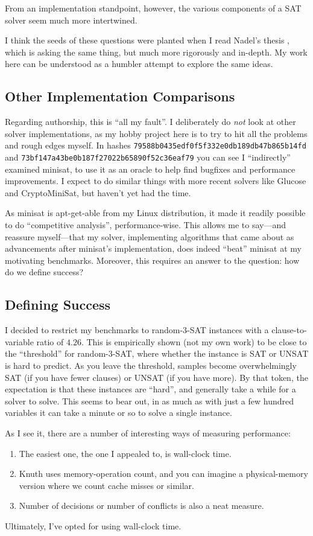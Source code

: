\documentclass{article}
\begin{document}
From an implementation standpoint, however, the various components of a SAT solver seem much more intertwined.

I think the seeds of these questions were planted when I read Nadel's thesis \cite{nadel2008}, which is asking the same thing, but much more rigorously and in-depth.
My work here can be understood as a humbler attempt to explore the same ideas.
\subsection{Other Implementation Comparisons}
Regarding authorship, this is ``all my fault''.
I deliberately do \emph{not} look at other solver implementations, as my hobby project here is to try to hit all the problems and rough edges myself.
In hashes {\tt 79588b0435edf0f5f332e0db189db47b865b14fd} and {\tt 73bf147a43be0b187f27022b65890f52c36eaf79} you can see I ``indirectly'' examined minisat, to use it as an oracle to help find bugfixes and performance improvements.
I expect to do similar things with more recent solvers like Glucose and CryptoMiniSat, but haven't yet had the time.

As minisat is apt-get-able from my Linux distribution, it made it readily possible to do ``competitive analysis'', performance-wise.
This allows me to say---and reassure myself---that my solver, implementing algorithms that came about as advancements after minisat's implementation, does indeed ``beat'' minisat at my motivating benchmarks.
Moreover, this requires an answer to the question: how do we define success?
\subsection{Defining Success}
I decided to restrict my benchmarks to random-3-SAT instances with a clause-to-variable ratio of $4.26$.
This is empirically shown (not my own work) to be close to the ``threshold'' for random-3-SAT, where whether the instance is SAT or UNSAT is hard to predict.
As you leave the threshold, samples become overwhelmingly SAT (if you have fewer clauses) or UNSAT (if you have more).
By that token, the expectation is that these instances are ``hard'', and generally take a while for a solver to solve.
This seems to bear out, in as much as with just a few hundred variables it can take a minute or so to solve a single instance.

As I see it, there are a number of interesting ways of measuring performance:
\begin{enumerate}
    \item The easiest one, the one I appealed to, is wall-clock time.
    \item Knuth\cite{knuth2015} uses memory-operation count, and you can imagine a physical-memory version where we count cache misses or similar.
    \item Number of decisions or number of conflicts is also a neat measure.
\end{enumerate}
Ultimately, I've opted for using wall-clock time.
\end{document}
